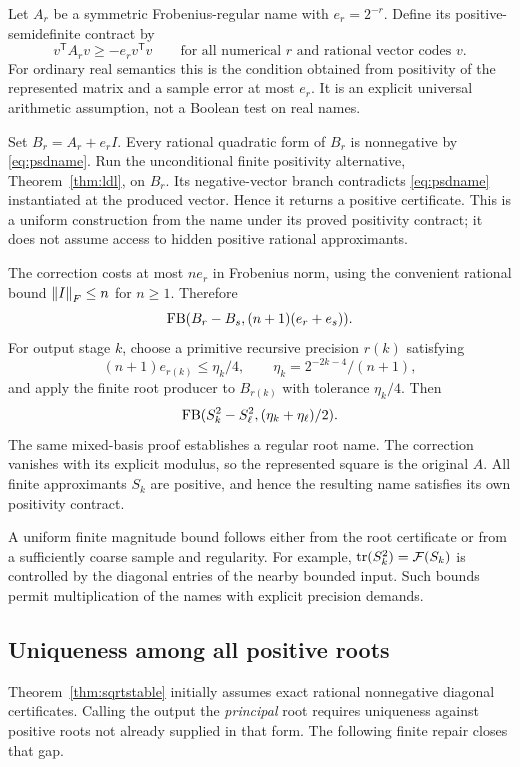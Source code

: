 Let $A_r$ be a symmetric Frobenius-regular name with $e_r=2^{-r}$. Define its positive-semidefinite contract by
\begin{equation}
 v^{\mathsf T}A_rv\ge-e_r v^{\mathsf T}v
 \qquad\text{for all numerical }r\text{ and rational vector codes }v.
 \label{eq:psdname}
\end{equation}
For ordinary real semantics this is the condition obtained from positivity of the represented matrix and a sample error at most $e_r$. It is an explicit universal arithmetic assumption, not a Boolean test on real names.

Set $B_r=A_r+e_rI$. Every rational quadratic form of $B_r$ is nonnegative by \eqref{eq:psdname}. Run the unconditional finite positivity alternative, Theorem~\ref{thm:ldl}, on $B_r$. Its negative-vector branch contradicts \eqref{eq:psdname} instantiated at the produced vector. Hence it returns a positive certificate. This is a uniform construction from the name under its proved positivity contract; it does not assume access to hidden positive rational approximants.

The correction costs at most $ne_r$ in Frobenius norm, using the convenient rational bound $\left\lVert I\right\rVert_F\le n$ for $n\ge1$. Therefore
\[
 \operatorname{FB}(B_r-B_s,(n+1)(e_r+e_s)).
\]
For output stage $k$, choose a primitive recursive precision $r(k)$ satisfying
\[
 (n+1)e_{r(k)}\le\eta_k/4,
 \qquad \eta_k=2^{-2k-4}/(n+1),
\]
and apply the finite root producer to $B_{r(k)}$ with tolerance $\eta_k/4$. Then
\[
 \operatorname{FB}(S_k^2-S_\ell^2,(\eta_k+\eta_\ell)/2).
\]
The same mixed-basis proof establishes a regular root name. The correction vanishes with its explicit modulus, so the represented square is the original $A$. All finite approximants $S_k$ are positive, and hence the resulting name satisfies its own positivity contract.

A uniform finite magnitude bound follows either from the root certificate or from a sufficiently coarse sample and regularity. For example,
$\operatorname{tr}(S_k^2)=\mathcal F(S_k)$ is controlled by the diagonal entries of the nearby bounded input. Such bounds permit multiplication of the names with explicit precision demands.

\subsection{Uniqueness among all positive roots}

Theorem~\ref{thm:sqrtstable} initially assumes exact rational nonnegative diagonal certificates. Calling the output the \emph{principal} root requires uniqueness against positive roots not already supplied in that form. The following finite repair closes that gap.

